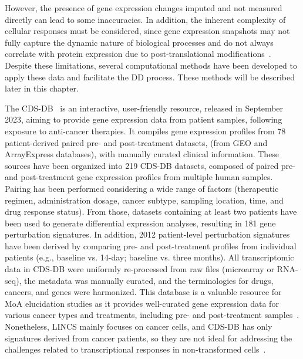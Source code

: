 However, the presence of gene expression changes imputed and not measured directly can lead to some inaccuracies. 
In addition, the inherent complexity of cellular responses must be considered, since gene expression snapshots may not fully capture the dynamic nature of biological processes and do not always correlate with protein expression due to post-translational modifications~\cite{RN38}. 
Despite these limitations, several computational methods have been developed to apply these data and facilitate the \gls{DD} process. 
These methods will be described later in this chapter. 

The \gls{CDS-DB}~\cite{RN84} is an interactive, user-friendly resource, released in September 2023, aiming to provide gene expression data from patient samples, following exposure to anti-cancer therapies. 
It compiles gene expression profiles from 78 patient-derived paired pre- and post-treatment datasets, (from \gls{GEO} and ArrayExpress databases), with manually curated clinical information. 
These sources have been organized into 219 \gls{CDS-DB} datasets, composed of paired pre- and post-treatment gene expression profiles from multiple human samples. 
Pairing has been performed considering a wide range of factors (therapeutic regimen, administration dosage, cancer subtype, sampling location, time, and drug response status). 
From those, datasets containing at least two patients have been used to generate differential expression analyses, resulting in 181 gene perturbation signatures. 
In addition, 2012 patient-level perturbation signatures have been derived by comparing pre- and post-treatment profiles from individual patients (e.g., baseline vs. 14-day; baseline vs. three months). 
All transcriptomic data in \gls{CDS-DB} were uniformly re-processed from raw files (microarray or \gls{RNA-seq}), the metadata was manually curated, and the terminologies for drugs, cancers, and genes were harmonized. 
This database is a valuable resource for \gls{MoA} elucidation studies as it provides well-curated gene expression data for various cancer types and treatments, including pre- and post-treatment samples~\cite{RN84}. 
Nonetheless, \gls{LINCS} mainly focuses on cancer cells, and \gls{CDS-DB} has only signatures derived from cancer patients, so they are not ideal for addressing the challenges related to transcriptional responses in non-transformed cells~\cite{RN86}.

